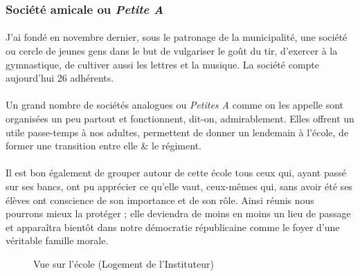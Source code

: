 \documentclass[../eBook.tex]{subfiles}
\begin{document}
    \newpage
    \subsubsection*{Société amicale ou \og \textit{Petite A} \fg{}}
      \paragraph{}J'ai fondé en novembre dernier, sous le patronage de la municipalité, une société ou cercle de jeunes gens dans le but de vulgariser le goût du tir, d'exercer à la gymnastique, de cultiver aussi les lettres et la musique. La société compte aujourd'hui 26 adhérents.
      \paragraph{}Un grand nombre de sociétés analogues ou \og \textit{Petites A} \fg{} comme on les appelle sont organisées un peu partout et fonctionnent, dit-on, admirablement. Elles offrent un utile passe-temps à nos adultes, permettent de donner un lendemain à l'école, de former une transition entre elle \& le régiment.
      \paragraph{}Il est bon également de grouper autour de cette école tous ceux qui, ayant passé sur ses bancs, ont pu apprécier ce qu'elle vaut, ceux-mêmes qui, sans avoir été ses élèves ont conscience de son importance et de son rôle. Ainsi réunis nous pourrons mieux la protéger ; elle deviendra de moins en moins un lieu de passage et apparaîtra bientôt dans notre démocratie républicaine comme le foyer d'une véritable famille morale.
      \begin{center}
        \begin{figure}[!ht]
        \end{figure}
      \end{center}
      \newpage
      \begin{center}
        \begin{figure}[!ht]
          \caption*{Vue sur l'école (Logement de l'Instituteur)}
        \end{figure}
      \end{center}
\end{document}

